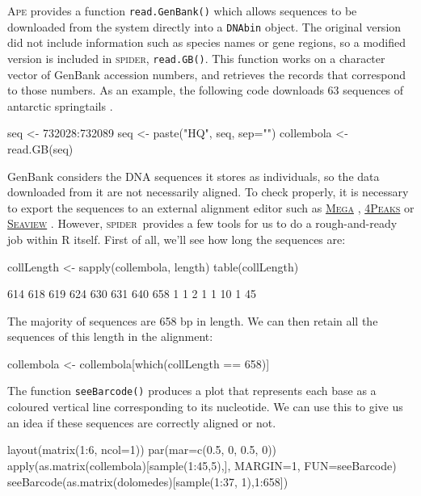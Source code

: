 \documentclass{article}
\newcommand{\spider}{\textsc{spider}} %
\newcommand{\progname}[1]{\textsc{#1}}
\newcommand{\fun}[1]{\texttt{#1}}
\begin{document}
\progname{Ape} provides a function \fun{read.GenBank()} which allows sequences to be downloaded from the system directly into a \fun{DNAbin} object. The original version did not include information such as species names or gene regions, so a modified version is included in \spider, \fun{read.GB()}. This function works on a character vector of GenBank accession numbers, and retrieves the records that correspond to those numbers. As an example, the following code downloads 63 sequences of antarctic springtails \citep{Green.etal.2011}.

\begin{console}
seq <- 732028:732089
seq <- paste("HQ", seq, sep="")
collembola <- read.GB(seq)
\end{console}

GenBank considers the DNA sequences it stores as individuals, so the data downloaded from it are not necessarily aligned. To check properly, it is necessary to export the sequences to an external alignment editor such as \href{http://www.megasoftware.net}{\progname{Mega}} \citep{SW.Tamu.etal.2011.MEGA}, \href{http://www.mekentosj.com/science/4peaks}{\progname{4Peaks}} or \href{http://pbil.univ-lyon1.fr/software/seaview.html}{\progname{Seaview}} \citep{SW.Guoy.etal.2010.SeaView}. However,  \spider~provides a few tools for us to do a rough-and-ready job within \progname{R} itself. First of all, we'll see how long the sequences are:

\begin{console}
collLength <- sapply(collembola, length)
table(collLength)
\end{console}

\begin{Routput}
 614 618 619 624 630 631 640 658 
  1   1   2   1   1  10   1  45
\end{Routput}

The majority of sequences are 658 bp in length. We can then retain all the sequences of this length in the alignment:

\begin{console}
collembola <- collembola[which(collLength == 658)]
\end{console}

The function \fun{seeBarcode()} produces a plot that represents each base as a coloured vertical line corresponding to its nucleotide. We can use this to give us an idea if these sequences are correctly aligned or not.

\begin{console}
layout(matrix(1:6, ncol=1))
par(mar=c(0.5, 0, 0.5, 0))
apply(as.matrix(collembola)[sample(1:45,5),], MARGIN=1, FUN=seeBarcode)
seeBarcode(as.matrix(dolomedes)[sample(1:37, 1),1:658])
\end{console}
\end{document}
